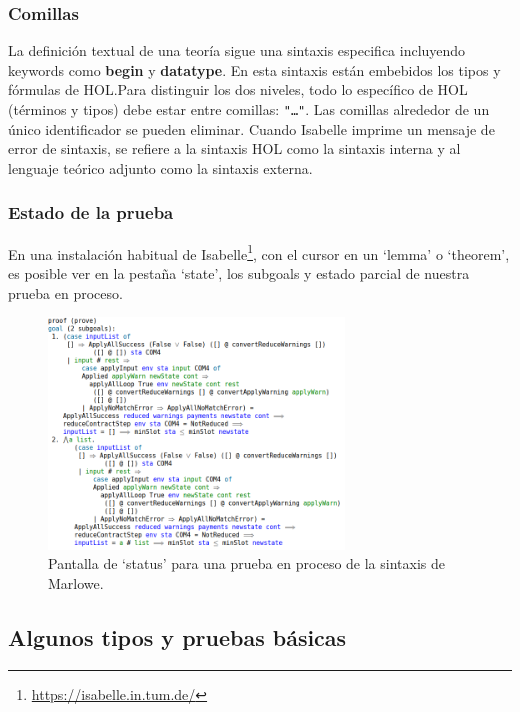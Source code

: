 \documentclass[12pt]{book}
\begin{document}
\subsubsection{Comillas}
La definición textual de una teoría sigue una sintaxis especifica incluyendo keywords como \textbf{begin} y \textbf{datatype}. En esta sintaxis están embebidos los tipos y fórmulas de HOL.\@ Para distinguir los dos niveles, todo lo específico de HOL (términos y tipos) debe estar entre comillas: \texttt{"\ldots"}. Las comillas alrededor de un único identificador se pueden eliminar. Cuando Isabelle imprime un mensaje de error de sintaxis, se refiere a la sintaxis HOL como la sintaxis interna y al lenguaje teórico adjunto como la sintaxis externa.%

\subsubsection{Estado de la prueba} 

En una instalación habitual de Isabelle\footnote{\href{https://isabelle.in.tum.de/}{https://isabelle.in.tum.de/}}, con el cursor en un `lemma' o `theorem', es posible ver en la pestaña `state', los subgoals y estado parcial de nuestra prueba en proceso.

\begin{figure}[H]
	\centering
    \includegraphics[width=0.7\textwidth]{Proof_state_isabelle.png}
	\caption{Pantalla de `status' para una prueba en proceso de la sintaxis de Marlowe.}\label{fig:Proof_state}
\end{figure}


\subsection{Algunos tipos y pruebas básicas}
\end{document}

